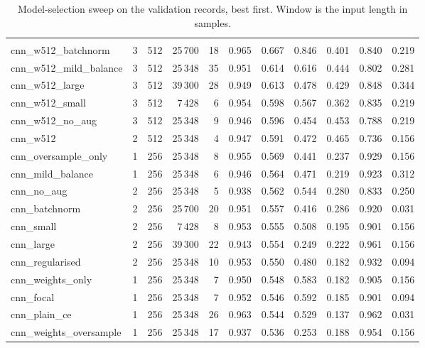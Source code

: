 \begin{table}[H]
  \centering
  \caption{Model-selection sweep on the validation records, best first. Window is the input length in samples.}
  \label{tab:model-selection}
  \begin{tabularx}{\linewidth}{lRRRRRRRRRR}
     &  &  &  &  &  &  &  &  &  &  \\
    cnn\_w512\_batchnorm & 3 & 512 & 25\,700 & 18 & 0.965 & 0.667 & 0.846 & 0.401 & 0.840 & 0.219 \\
    cnn\_w512\_mild\_balance & 3 & 512 & 25\,348 & 35 & 0.951 & 0.614 & 0.616 & 0.444 & 0.802 & 0.281 \\
    cnn\_w512\_large & 3 & 512 & 39\,300 & 28 & 0.949 & 0.613 & 0.478 & 0.429 & 0.848 & 0.344 \\
    cnn\_w512\_small & 3 & 512 & 7\,428 & 6 & 0.954 & 0.598 & 0.567 & 0.362 & 0.835 & 0.219 \\
    cnn\_w512\_no\_aug & 3 & 512 & 25\,348 & 9 & 0.946 & 0.596 & 0.454 & 0.453 & 0.788 & 0.219 \\
    cnn\_w512 & 2 & 512 & 25\,348 & 4 & 0.947 & 0.591 & 0.472 & 0.465 & 0.736 & 0.156 \\
    cnn\_oversample\_only & 1 & 256 & 25\,348 & 8 & 0.955 & 0.569 & 0.441 & 0.237 & 0.929 & 0.156 \\
    cnn\_mild\_balance & 1 & 256 & 25\,348 & 6 & 0.946 & 0.564 & 0.471 & 0.219 & 0.923 & 0.312 \\
    cnn\_no\_aug & 2 & 256 & 25\,348 & 5 & 0.938 & 0.562 & 0.544 & 0.280 & 0.833 & 0.250 \\
    cnn\_batchnorm & 2 & 256 & 25\,700 & 20 & 0.951 & 0.557 & 0.416 & 0.286 & 0.920 & 0.031 \\
    cnn\_small & 2 & 256 & 7\,428 & 8 & 0.953 & 0.555 & 0.508 & 0.195 & 0.901 & 0.156 \\
    cnn\_large & 2 & 256 & 39\,300 & 22 & 0.943 & 0.554 & 0.249 & 0.222 & 0.961 & 0.156 \\
    cnn\_regularised & 2 & 256 & 25\,348 & 10 & 0.953 & 0.550 & 0.480 & 0.182 & 0.932 & 0.094 \\
    cnn\_weights\_only & 1 & 256 & 25\,348 & 7 & 0.950 & 0.548 & 0.583 & 0.182 & 0.905 & 0.156 \\
    cnn\_focal & 1 & 256 & 25\,348 & 7 & 0.952 & 0.546 & 0.592 & 0.185 & 0.901 & 0.094 \\
    cnn\_plain\_ce & 1 & 256 & 25\,348 & 26 & 0.963 & 0.544 & 0.529 & 0.137 & 0.962 & 0.031 \\
    cnn\_weights\_oversample & 1 & 256 & 25\,348 & 17 & 0.937 & 0.536 & 0.253 & 0.188 & 0.954 & 0.156 \\
    \bottomrule
  \end{tabularx}
\end{table}
